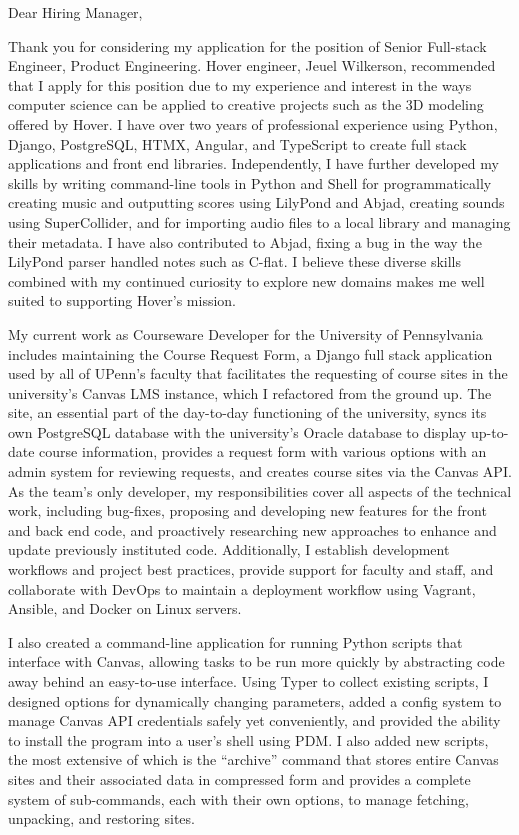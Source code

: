 \documentclass{letter}
\begin{document}
\header

Dear Hiring Manager,

Thank you for considering my application for the position of Senior Full-stack
Engineer, Product Engineering. Hover engineer, Jeuel Wilkerson, recommended that
I apply for this position due to my experience and interest in the ways computer
science can be applied to creative projects such as the 3D modeling offered by
Hover. I have over two years of professional experience using Python, Django,
PostgreSQL, HTMX, Angular, and TypeScript to create full stack applications and
front end libraries. Independently, I have further developed my skills by
writing command-line tools in Python and Shell for programmatically creating
music and outputting scores using LilyPond and Abjad, creating sounds using
SuperCollider, and for importing audio files to a local library and managing
their metadata. I have also contributed to Abjad, fixing a bug in the way the
LilyPond parser handled notes such as C-flat. I believe these diverse skills
combined with my continued curiosity to explore new domains makes me well suited
to supporting Hover’s mission.

My current work as Courseware Developer for the University of Pennsylvania
includes maintaining the Course Request Form, a Django full stack application
used by all of UPenn’s faculty that facilitates the requesting of course sites
in the university’s Canvas LMS instance, which I refactored from the ground up.
The site, an essential part of the day-to-day functioning of the university,
syncs its own PostgreSQL database with the university’s Oracle database to
display up-to-date course information, provides a request form with various
options with an admin system for reviewing requests, and creates course sites
via the Canvas API. As the team’s only developer, my responsibilities cover all
aspects of the technical work, including bug-fixes, proposing and developing new
features for the front and back end code, and proactively researching new
approaches to enhance and update previously instituted code. Additionally, I
establish development workflows and project best practices, provide support for
faculty and staff, and collaborate with DevOps to maintain a deployment workflow
using Vagrant, Ansible, and Docker on Linux servers.

I also created a command-line application for running Python scripts that
interface with Canvas, allowing tasks to be run more quickly by abstracting code
away behind an easy-to-use interface. Using Typer to collect existing scripts, I
designed options for dynamically changing parameters, added a config system to
manage Canvas API credentials safely yet conveniently, and provided the ability
to install the program into a user’s shell using PDM. I also added new scripts,
the most extensive of which is the “archive” command that stores entire Canvas
sites and their associated data in compressed form and provides a complete
system of sub-commands, each with their own options, to manage fetching,
unpacking, and restoring sites.
\end{document}
